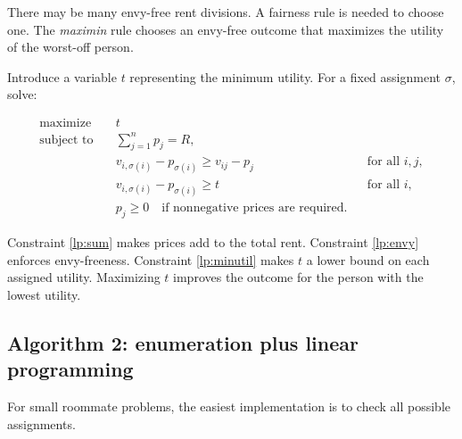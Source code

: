 \documentclass[11pt]{article}
\begin{document}
There may be many envy-free rent divisions. A fairness rule is needed to choose one. The \emph{maximin} rule chooses an envy-free outcome that maximizes the utility of the worst-off person.

Introduce a variable $t$ representing the minimum utility. For a fixed assignment $\sigma$, solve:

\begin{align}
    \text{maximize} \quad & t \\
    \text{subject to} \quad
    & \sum_{j=1}^{n}p_j=R, \label{lp:sum}\\
    & v_{i,\sigma(i)}-p_{\sigma(i)}\geq v_{ij}-p_j
    && \text{for all }i,j, \label{lp:envy}\\
    & v_{i,\sigma(i)}-p_{\sigma(i)}\geq t
    && \text{for all }i, \label{lp:minutil}\\
    & p_j\geq 0 \quad \text{if nonnegative prices are required.} \label{lp:nonnegative}
\end{align}

Constraint \eqref{lp:sum} makes prices add to the total rent. Constraint \eqref{lp:envy} enforces envy-freeness. Constraint \eqref{lp:minutil} makes $t$ a lower bound on each assigned utility. Maximizing $t$ improves the outcome for the person with the lowest utility.

\subsection{Algorithm 2: enumeration plus linear programming}

For small roommate problems, the easiest implementation is to check all possible assignments.

\begin{center}
\end{center}
\end{document}
